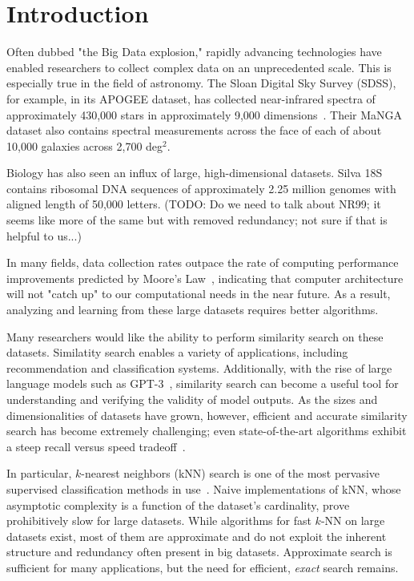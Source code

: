 \section{Introduction}
\label{sec:introduction}
Often dubbed "the Big Data explosion," rapidly advancing technologies have enabled researchers to collect complex data on an unprecedented scale. 
This is especially true in the field of astronomy. 
The Sloan Digital Sky Survey (SDSS), for example, in its APOGEE dataset, has collected near-infrared spectra of approximately 430,000 stars in approximately 9,000 dimensions~\cite{alam2015eleventh}. 
Their MaNGA dataset also contains spectral measurements across the face of each of about 10,000 galaxies across 2,700 deg$^2$.

Biology has also seen an influx of large, high-dimensional datasets. Silva 18S contains ribosomal DNA sequences of approximately 2.25 
million genomes with aligned length of 50,000 letters. (TODO: Do we need to talk about NR99; it seems like more of the same but 
with removed redundancy; not sure if that is helpful to us...) 

In many fields, data collection rates outpace the rate of computing performance improvements predicted by Moore's Law~\cite{moore1965cramming}, indicating 
that computer architecture will not "catch up" to our computational needs in the near future. As a result, analyzing and learning from these large datasets 
requires better algorithms. 

Many researchers would like the ability to perform similarity search on these datasets. 
Similatity search enables a variety of applications, including recommendation and classification systems. 
Additionally, with the rise of large language models such as GPT-3~\cite{brown2020language}, similarity search can become a useful tool for 
understanding and verifying the validity of model outputs. 
As the sizes and dimensionalities of datasets have grown, however, efficient and accurate similarity search has become extremely challenging; 
even state-of-the-art algorithms exhibit a steep recall versus speed tradeoff~\cite{ishaq2019clustered}.


In particular, $k$-nearest neighbors (kNN) search is one of the most pervasive supervised classification methods in use~\cite{fix1952discriminatory, cover1967nearest}.
Naive implementations of kNN, whose asymptotic complexity is a function of the dataset's cardinality, 
prove prohibitively slow for large datasets. While algorithms for fast $k$-NN on large datasets exist, most of them are approximate and do not 
exploit the inherent structure and redundancy often present in big datasets. Approximate search is sufficient for many applications, but the 
need for efficient, \emph{exact} search remains.

